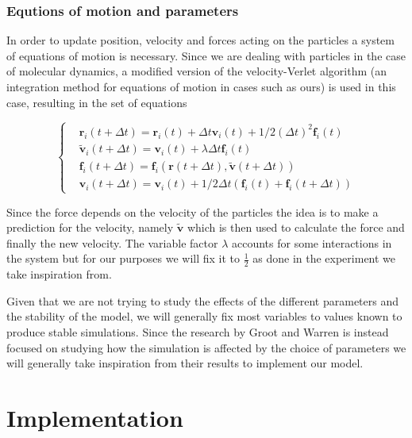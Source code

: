 \documentclass[]{usiinfbachelorproject}
\begin{document}
\subsubsection{Equtions of motion and parameters}
In order to update position, velocity and forces acting on the particles a system of equations of motion is 
necessary. Since we are dealing with particles in the case of molecular dynamics, a modified version of the 
velocity-Verlet algorithm (an integration method for equations of motion in cases such as ours) is used in this case, 
resulting in the set of equations 

\begin{equation*}
    \left\{
        \begin{aligned}
          & \textbf{r}_i (t + \Delta t) = \textbf{r}_i (t) + \Delta t \textbf{v}_i (t) + 1/2(\Delta t)^2 \textbf{f}_i(t)\\
          & \tilde{\textbf{v}}_i (t + \Delta t) = \textbf{v}_i (t) + \lambda  \Delta t \textbf{f}_i(t)\\
          & \textbf{f}_i(t + \Delta t) = \textbf{f}_i(\textbf{r} (t + \Delta t), \tilde{\textbf{v}} (t + \Delta t))\\
          & \textbf{v}_i (t + \Delta t) = \textbf{v}_i (t) + 1/2 \Delta t (\textbf{f}_i(t) + \textbf{f}_i(t + \Delta t))
        \end{aligned}
      \right.
\end{equation*}

Since the force depends on the velocity of the particles the idea is to make a prediction for the velocity, namely 
$\tilde{\textbf{v}}$ which is then used to calculate the force and finally the new velocity. The variable factor 
$\lambda$ accounts for some interactions in the system but for our purposes we will fix it to $\frac{1}{2}$ as 
done in the experiment we take inspiration from. 

Given that we are not trying to study the effects of the different parameters and the stability of the model, we 
will generally fix most variables to values known to produce stable simulations. Since the research by Groot and Warren is 
instead focused on studying how the simulation is affected by the choice of parameters we will generally take inspiration 
from their results to implement our model.



\newpage
\section{Implementation}
\end{document}
